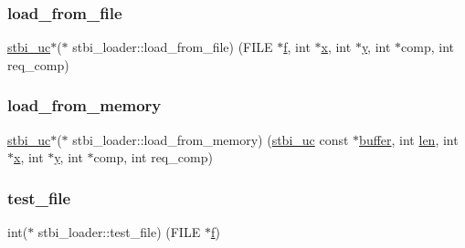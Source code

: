 \subsubsection{\texorpdfstring{load\+\_\+from\+\_\+file}{load\_from\_file}}
{\footnotesize\ttfamily \hyperlink{stb__image__aug_8h_a28eb51a1512ce382ee50f20e1d04d50d}{stbi\+\_\+uc}$\ast$($\ast$ stbi\+\_\+loader\+::load\+\_\+from\+\_\+file) (F\+I\+LE $\ast$\hyperlink{glcorearb_8h_a691492ec0bd6383f91200e49f6ae40ed}{f}, int $\ast$\hyperlink{gl_8h_ad0e63d0edcdbd3d79554076bf309fd47}{x}, int $\ast$\hyperlink{gl_8h_a1675d9d7bb68e1657ff028643b4037e3}{y}, int $\ast$comp, int req\+\_\+comp)}

\mbox{\label{structstbi__loader_a19c3a299a2acffd3a6a9cde60557fb59}} 
\subsubsection{\texorpdfstring{load\+\_\+from\+\_\+memory}{load\_from\_memory}}
{\footnotesize\ttfamily \hyperlink{stb__image__aug_8h_a28eb51a1512ce382ee50f20e1d04d50d}{stbi\+\_\+uc}$\ast$($\ast$ stbi\+\_\+loader\+::load\+\_\+from\+\_\+memory) (\hyperlink{stb__image__aug_8h_a28eb51a1512ce382ee50f20e1d04d50d}{stbi\+\_\+uc} const $\ast$\hyperlink{glcorearb_8h_a76461e97a098d2c9ae20ac193d3825ae}{buffer}, int \hyperlink{glext_8h_a652168017ea9a8bbcead03d5c16269fb}{len}, int $\ast$\hyperlink{gl_8h_ad0e63d0edcdbd3d79554076bf309fd47}{x}, int $\ast$\hyperlink{gl_8h_a1675d9d7bb68e1657ff028643b4037e3}{y}, int $\ast$comp, int req\+\_\+comp)}

\mbox{\label{structstbi__loader_a29f8108b16faac0a11f5120b45a39153}} 
\subsubsection{\texorpdfstring{test\+\_\+file}{test\_file}}
{\footnotesize\ttfamily int($\ast$ stbi\+\_\+loader\+::test\+\_\+file) (F\+I\+LE $\ast$\hyperlink{glcorearb_8h_a691492ec0bd6383f91200e49f6ae40ed}{f})}

\mbox{\label{structstbi__loader_ad2df36e7390f0a75bdd46f90afae9267}} 
